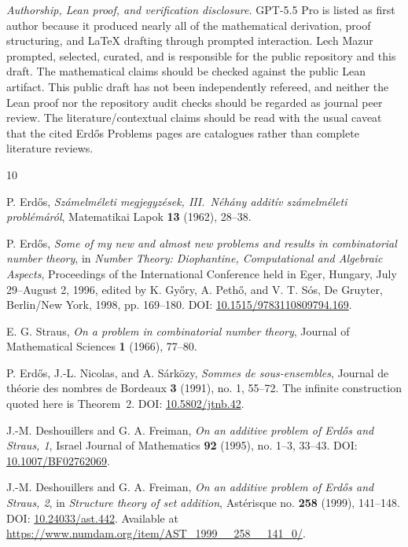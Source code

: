 \documentclass[11pt]{article}
\begin{document}
\medskip
\noindent\textit{Authorship, Lean proof, and verification disclosure.}
GPT-5.5 Pro is listed as first author because it produced nearly all of the mathematical derivation, proof structuring, and LaTeX drafting through prompted interaction.  Lech Mazur prompted, selected, curated, and is responsible for the public repository and this draft.  The mathematical claims should be checked against the public Lean artifact.  This public draft has not been independently refereed, and neither the Lean proof nor the repository audit checks should be regarded as journal peer review.  The literature/contextual claims should be read with the usual caveat that the cited Erd\H{o}s Problems pages are catalogues rather than complete literature reviews.

\begin{thebibliography}{10}

P. Erd\H{o}s,
\emph{Sz\'amelm\'eleti megjegyz\'esek, III.\ N\'eh\'any addit\'iv sz\'amelm\'eleti probl\'em\'ar\'ol},
Matematikai Lapok \textbf{13} (1962), 28--38.

P. Erd\H{o}s,
\emph{Some of my new and almost new problems and results in combinatorial number theory},
in \emph{Number Theory: Diophantine, Computational and Algebraic Aspects},
Proceedings of the International Conference held in Eger, Hungary, July 29--August 2, 1996,
edited by K. Gy\H{o}ry, A. Peth\H{o}, and V. T. S\'os,
De Gruyter, Berlin/New York, 1998, pp. 169--180.
DOI: \href{https://doi.org/10.1515/9783110809794.169}{10.1515/9783110809794.169}.

E. G. Straus,
\emph{On a problem in combinatorial number theory},
Journal of Mathematical Sciences \textbf{1} (1966), 77--80.

P. Erd\H{o}s, J.-L. Nicolas, and A. S\'ark\"ozy,
\emph{Sommes de sous-ensembles},
Journal de th\'eorie des nombres de Bordeaux \textbf{3} (1991), no. 1, 55--72.
The infinite construction quoted here is Theorem~2.
DOI: \href{https://doi.org/10.5802/jtnb.42}{10.5802/jtnb.42}.

J.-M. Deshouillers and G. A. Freiman,
\emph{On an additive problem of Erd\H{o}s and Straus, 1},
Israel Journal of Mathematics \textbf{92} (1995), no. 1--3, 33--43.
DOI: \href{https://doi.org/10.1007/BF02762069}{10.1007/BF02762069}.

J.-M. Deshouillers and G. A. Freiman,
\emph{On an additive problem of Erd\H{o}s and Straus, 2},
in \emph{Structure theory of set addition}, Ast\'erisque no. \textbf{258} (1999), 141--148.
DOI: \href{https://doi.org/10.24033/ast.442}{10.24033/ast.442}.
Available at \url{https://www.numdam.org/item/AST_1999__258__141_0/}.


\end{thebibliography}
\end{document}
